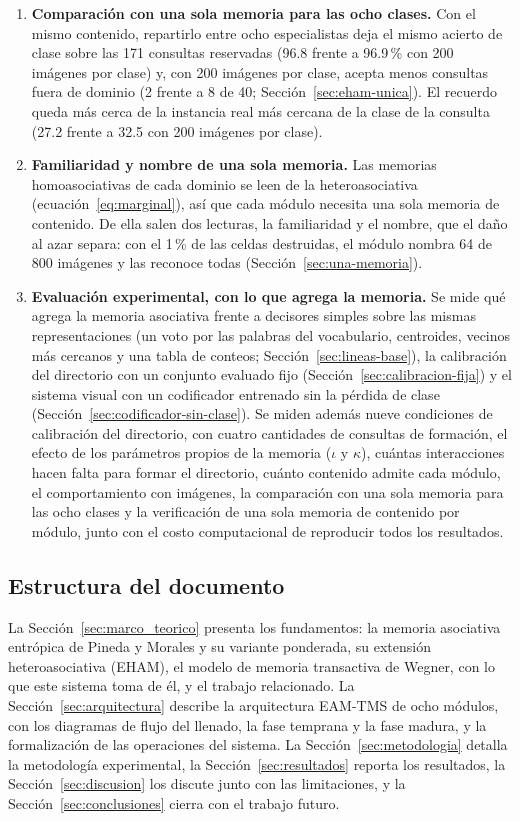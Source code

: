 \begin{enumerate}
    \item \textbf{Comparación con una sola memoria para las ocho clases.}
    Con el mismo contenido, repartirlo entre ocho especialistas deja el mismo acierto de
    clase sobre las 171 consultas reservadas (96.8 frente a 96.9\,\% con 200 imágenes
    por clase) y, con 200 imágenes por clase, acepta menos consultas fuera de dominio (2
    frente a 8 de 40; Sección~\ref{sec:eham-unica}).
    El recuerdo queda más cerca de la instancia real más cercana de la clase de la
    consulta (27.2 frente a 32.5 con 200 imágenes por clase).

    \item \textbf{Familiaridad y nombre de una sola memoria.}
    Las memorias homoasociativas de cada dominio se leen de la heteroasociativa
    (ecuación~\eqref{eq:marginal}), así que cada módulo necesita una sola memoria de
    contenido.
    De ella salen dos lecturas, la familiaridad y el nombre, que el daño al azar separa:
    con el 1\,\% de las celdas destruidas, el módulo nombra 64 de 800 imágenes y las
    reconoce todas (Sección~\ref{sec:una-memoria}).

    \item \textbf{Evaluación experimental, con lo que agrega la memoria.}
    Se mide qué agrega la memoria asociativa frente a decisores simples sobre las mismas
    representaciones (un voto por las palabras del vocabulario, centroides, vecinos más
    cercanos y una tabla de conteos; Sección~\ref{sec:lineas-base}), la calibración del
    directorio con un conjunto evaluado fijo (Sección~\ref{sec:calibracion-fija}) y el
    sistema visual con un codificador entrenado sin la pérdida de clase
    (Sección~\ref{sec:codificador-sin-clase}).
    Se miden además nueve condiciones de calibración del directorio, con cuatro
    cantidades de consultas de formación, el efecto de los parámetros propios de la
    memoria ($\iota$ y $\kappa$), cuántas interacciones hacen falta para formar el
    directorio, cuánto contenido admite cada módulo, el comportamiento con imágenes, la
    comparación con una sola memoria para las ocho clases y la verificación de una sola
    memoria de contenido por módulo, junto con el costo computacional de reproducir
    todos los resultados.
\end{enumerate}

\subsection*{Estructura del documento}

La Sección~\ref{sec:marco_teorico} presenta los fundamentos: la memoria asociativa
entrópica de Pineda y Morales y su variante ponderada, su extensión heteroasociativa
(EHAM), el modelo de memoria transactiva de Wegner, con lo que este sistema toma de él,
y el trabajo relacionado.
La Sección~\ref{sec:arquitectura} describe la arquitectura EAM-TMS de ocho módulos, con
los diagramas de flujo del llenado, la fase temprana y la fase madura, y la
formalización de las operaciones del sistema.
La Sección~\ref{sec:metodologia} detalla la metodología experimental, la
Sección~\ref{sec:resultados} reporta los resultados, la Sección~\ref{sec:discusion} los
discute junto con las limitaciones, y la Sección~\ref{sec:conclusiones} cierra con el
trabajo futuro.
